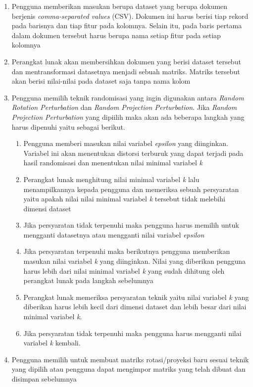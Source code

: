 \begin{enumerate}
    \item Pengguna memberikan masukan berupa dataset yang berupa dokumen berjenis \textit{comma-separated values} (CSV). Dokumen ini harus berisi tiap rekord pada barisnya dan tiap fitur pada kolomnya. Selain itu, pada baris pertama dalam dokumen tersebut harus berupa nama setiap fitur pada setiap kolomnya
    \item Perangkat lunak akan membersihkan dokumen yang berisi dataset tersebut dan mentransformasi datasetnya menjadi sebuah matriks. Matriks tersebut akan berisi nilai-nilai pada dataset saja tanpa nama kolom
    \item Pengguna memilih teknik randomisasi yang ingin digunakan antara \textit{Random Rotation Perturbation} dan \textit{Random Projection Perturbation}. Jika \textit{Random Projection Perturbation} yang dipiilih maka akan ada beberapa langkah yang harus dipenuhi yaitu sebagai berikut.
    \begin{enumerate}
        \item Pengguna memberi masukan nilai variabel \textit{epsilon} yang diinginkan. Variabel ini akan menentukan distorsi terburuk yang dapat terjadi pada hasil randomisasi dan menentukan nilai minimal variabel \textit{k}
        \item Perangkat lunak menghitung nilai minimal variabel \textit{k} lalu menampilkannya kepada pengguna dan memeriksa sebuah persyaratan yaitu apakah nilai nilai minimal variabel \textit{k} tersebut tidak melebihi dimensi dataset
        \item Jika persyaratan tidak terpenuhi maka pengguna harus memilih untuk mengganti datasetnya atau mengganti nilai variabel \textit{epsilon}
        \item Jika persyaratan terpenuhi maka berikutnya pengguna memberikan masukan nilai variabel \textit{k} yang diinginkan. Nilai yang diberikan pengguna harus lebih dari nilai minimal variabel \textit{k} yang sudah dihitung oleh perangkat lunak pada langkah sebelumnya
        \item Perangkat lunak memeriksa persyaratan teknik yaitu nilai variabel \textit{k} yang diberikan harus lebih kecil dari dimensi dataset dan lebih besar dari nilai minimal variabel \textit{k}.
        \item Jika persyaratan tidak terpenuhi maka pengguna harus mengganti nilai variabel \textit{k} kembali.
    \end{enumerate}
    \item Pengguna memilih untuk membuat matriks rotasi/proyeksi baru sesuai teknik yang dipilih atau pengguna dapat mengimpor matriks yang telah dibuat dan disimpan sebelumnya

\end{enumerate}
